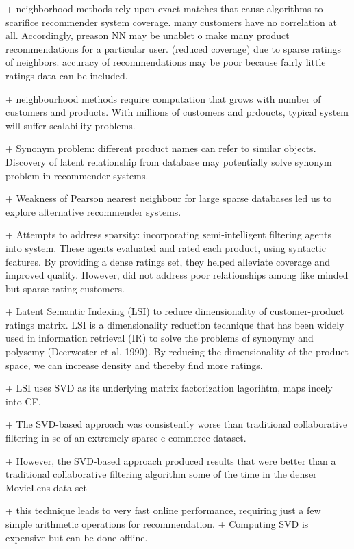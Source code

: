 + neighborhood methods rely upon exact matches that cause algorithms to scarifice recommender system coverage. many customers have no correlation at all. Accordingly, preason NN may be unablet o make many product recommendations for a particular user. (reduced coverage) due to sparse ratings of neighbors. accuracy of recommendations may be poor because fairly little ratings data can be included. 

+ neighbourhood methods require computation that grows with number of customers and products. With millions of customers and prdoucts, typical system will suffer scalability problems. 

+ Synonym problem: different product names can refer to similar objects. Discovery of latent relationship from database may potentially solve synonym problem in recommender systems. 

+ Weakness of Pearson nearest neighbour for large sparse databases led us to explore alternative recommender systems. 


+ Attempts to address sparsity: incorporating semi-intelligent filtering agents into system. These agents evaluated and rated each product, using syntactic features. By providing a dense ratings set, they helped alleviate coverage and improved quality. However, did not address poor relationships among like minded but sparse-rating customers. 

+ Latent Semantic Indexing (LSI) to reduce dimensionality of customer-product ratings matrix. LSI is a dimensionality reduction technique that has been widely used in information retrieval (IR) to
solve the problems of synonymy and polysemy
(Deerwester et al. 1990).
By reducing the dimensionality
of the product space, we can increase density and
thereby find more ratings. 

+ LSI uses SVD as its underlying matrix factorization lagorihtm, maps incely into CF. 

+ The SVD-based approach was
consistently worse than traditional collaborative
filtering in se of an extremely sparse e-commerce
dataset.

+ However, the SVD-based approach
produced results that were better than a traditional
collaborative filtering algorithm some of the time in
the denser MovieLens data set

+ this technique leads to very fast online performance, requiring just a few simple arithmetic operations for recommendation. 
+ Computing SVD is expensive but can be done offline. 


